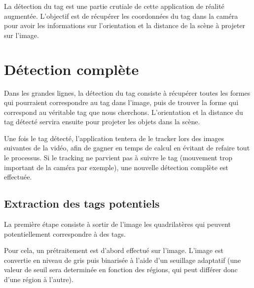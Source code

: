 \newpage
{}

La détection du tag est une partie crutiale de cette application de réalité augmentée. L'objectif est de récupérer les coordonnées du tag dans la caméra pour avoir les informations sur l'orientation et la distance de la scène à projeter sur l'image.

    \section{Détection complète}

    Dans les grandes lignes, la détection du tag consiste à récupérer toutes les formes qui pourraient correspondre au tag dans l'image, puis de trouver la forme qui correspond au véritable tag que nous cherchons. L'orientation et la distance du tag détecté servira ensuite pour projeter les objets dans la scène.

    Une fois le tag détecté, l'application tentera de le tracker lors des images suivantes de la vidéo, afin de gagner en temps de calcul en évitant de refaire tout le processus. Si le tracking ne parvient pas à suivre le tag (mouvement trop important de la caméra par exemple), une nouvelle détection complète est effectuée.

        \subsection{Extraction des tags potentiels}

        La première étape consiste à sortir de l'image les quadrilatères qui peuvent potentiellement correspondre à des tags.

        Pour cela, un prétraitement est d'abord effectué sur l'image. L'image est convertie en niveau de gris puis binarisée à l'aide d'un seuillage adaptatif (une valeur de seuil sera determinée en fonction des régions, qui peut différer donc d'une région à l'autre).


